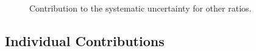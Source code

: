 \begin{figure}[h!]
    \centering
    \qquad
    \\
    \caption{Contribution to the systematic uncertainty for other ratios.}
    \label{fig:TotalSysRatiosOtherRpPb}
\end{figure}

\newpage

\subsection{Individual Contributions}
\label{subsec:appendixIndividualSystematicsRatiospPb}

